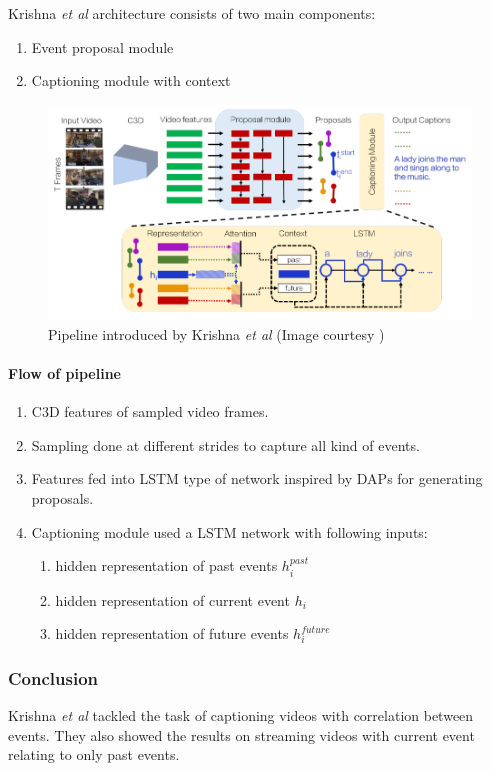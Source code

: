 \par Krishna \textit{et al} architecture consists of two main components:
\begin{enumerate}
	\item Event proposal module
	\item Captioning module with context
\end{enumerate}

\begin{figure}[h]
	\includegraphics[width=\linewidth]{assets/img/krishna2017densecaptioning-architecture.png}
	\caption{Pipeline introduced by Krishna \textit{et al} (Image courtesy \cite{krishna2017densecaptioning})}
\end{figure}

\paragraph{Flow of pipeline}
\begin{enumerate}
	\item C3D features of sampled video frames.
	\item Sampling done at different strides to capture all kind of events.
	\item Features fed into LSTM type of network inspired by DAPs\cite{Escorcia2016DAPsDA} for generating proposals.
	\item Captioning module used a LSTM network with following inputs:
	\begin{enumerate}
		\item hidden representation of past events $h_i^{past}$
		\item hidden representation of current event $h_i$
		\item hidden representation of future events $h_i^{future}$
	\end{enumerate}
\end{enumerate}


\subsubsection{Conclusion}

\par Krishna \textit{et al} tackled the task of captioning videos with correlation between events. They also showed the results on streaming videos with current event relating to only past events.